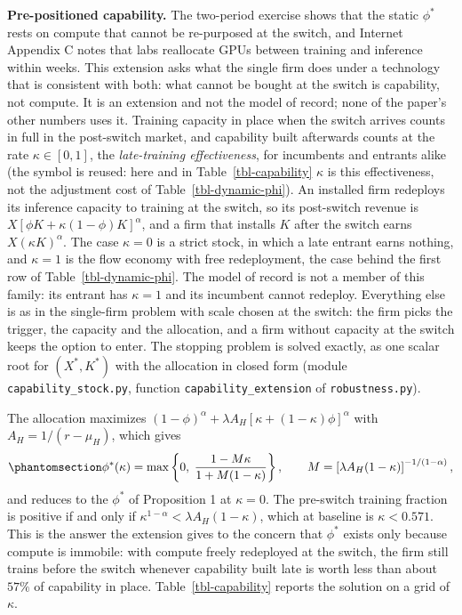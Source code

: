 \documentclass[
  11pt,
  letterpaper,
]{scrartcl}
\newcounter{none} %
\begin{document}
\textbf{Pre-positioned capability.} The two-period exercise shows that
the static \(\phi^*\) rests on compute that cannot be re-purposed at the
switch, and Internet Appendix C notes that labs reallocate GPUs between
training and inference within weeks. This extension asks what the single
firm does under a technology that is consistent with both: what cannot
be bought at the switch is capability, not compute. It is an extension
and not the model of record; none of the paper's other numbers uses it.
Training capacity in place when the switch arrives counts in full in the
post-switch market, and capability built afterwards counts at the rate
\(\kappa \in [0, 1]\), the \emph{late-training effectiveness}, for
incumbents and entrants alike (the symbol is reused: here and in
Table~\ref{tbl-capability} \(\kappa\) is this effectiveness, not the
adjustment cost of Table~\ref{tbl-dynamic-phi}). An installed firm
redeploys its inference capacity to training at the switch, so its
post-switch revenue is \(X[\phi K + \kappa(1-\phi)K]^\alpha\), and a
firm that installs \(K\) after the switch earns \(X(\kappa K)^\alpha\).
The case \(\kappa = 0\) is a strict stock, in which a late entrant earns
nothing, and \(\kappa = 1\) is the flow economy with free redeployment,
the case behind the first row of Table~\ref{tbl-dynamic-phi}. The model
of record is not a member of this family: its entrant has \(\kappa = 1\)
and its incumbent cannot redeploy. Everything else is as in the
single-firm problem with scale chosen at the switch: the firm picks the
trigger, the capacity and the allocation, and a firm without capacity at
the switch keeps the option to enter. The stopping problem is solved
exactly, as one scalar root for \((X^*, K^*)\) with the allocation in
closed form (module \texttt{capability\_stock.py}, function
\texttt{capability\_extension} of \texttt{robustness.py}).

The allocation maximizes
\((1-\phi)^\alpha + \lambda A_H [\kappa + (1-\kappa)\phi]^\alpha\) with
\(A_H = 1/(r - \mu_H)\), which gives
\begin{equation}\protect\phantomsection\label{eq-phi-kappa}{
\phi^*(\kappa) = \max\left\{0,\; \frac{1 - M\kappa}{1 + M(1-\kappa)}\right\}, \qquad M = \left[\lambda A_H (1-\kappa)\right]^{-1/(1-\alpha)},
}\end{equation} and reduces to the \(\phi^*\) of Proposition 1 at
\(\kappa = 0\). The pre-switch training fraction is positive if and only
if \(\kappa^{1-\alpha} < \lambda A_H (1-\kappa)\), which at baseline is
\(\kappa < 0.571\). This is the answer the extension gives to the
concern that \(\phi^*\) exists only because compute is immobile: with
compute freely redeployed at the switch, the firm still trains before
the switch whenever capability built late is worth less than about
\(57\%\) of capability in place. Table~\ref{tbl-capability} reports the
solution on a grid of \(\kappa\).
\end{document}
